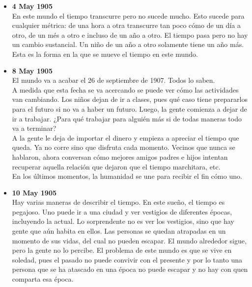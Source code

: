 \documentclass[12pt,a4paper]{report}
\begin{document}
\begin{itemize}
{\begin{itemize}[label=$\bullet$]
{            desata una de las peores olas de crímen en la historia. ¿Esto
            último es el resultado de lo primero o una causa colocada de una
            manera distinta a la que estamos acostumbrados?\\
            Los científicos no tienen prestigio, pues sus predicciónes se han
            vuelto descripciones. \\
            En este mundo, la gente vive sin temer por las consecuencias que sus
            acciones puedan traer en el futuro, pues esas consecuencias ya
            sucedieron.
        }
        \item{\textbf{4 May 1905}\\
            En este mundo el tiempo transcurre pero no sucede mucho. Esto sucede
            para cualquier métrica: de una hora a otra transcurre tan poco cómo
            de un día a otro, de un més a otro e incluso de un año a otro. El
            tiempo pasa pero no hay un cambio sustancial. Un niño de un año a
            otro solamente tiene un año más. Esta es la forma en la que se mueve
            el tiempo en este mundo.
        }
        \item{\textbf{8 May 1905}\\
            El mundo va a acabar el 26 de septiembre de 1907. Todos lo saben.\\
            A medida que esta fecha se va acercando se puede ver cómo las
            actividades van cambiando. Los niños dejan de ir a clases, pues qué
            caso tiene prepararlos para el futuro si no va a haber un futuro.
            Luego, la gente comienza a dejar de ir a trabajar. ¿Para qué
            trabajar para alguién más si de todas maneras todo va a terminar?\\
            A la gente le deja de importar el dinero y empieza a apreciar el
            tiempo que queda. Ya no corre sino que disfruta cada momento.
            Vecinos que nunca se hablaron, ahora conversan cómo mejores amigos
            padres e hijos intentan recuperar aquella relación que dejaron que
            el tiempo marchitara, etc.\\
            En los últimos momentos, la humanidad se une para recibir el fin
            cómo uno.
        }
        \item{\textbf{10 May 1905}\\
            Hay varias maneras de describir el tiempo. En este sueño, el tiempo
            es pegajoso. Uno puede ir a una ciudad y ver vestigios de diferentes
            épocas, incluyendo la actual. Lo sorprendente no es ver los
            vestigios, sino que hay gente que aún habita en ellos. Las personas
            se quedan atrapadas en un momento de sus vidas, del cual no pueden
            escapar. El mundo alrededor sigue, pero la gente no lo percibe. El
            problema de este mundo es que se vive en soledad, pues el pasado no
            puede convivir con el presente y por lo tanto una persona que se ha
            atascado en una época no puede escapar y no hay con quen comparta
            esa época.
        }
    \end{itemize}
}
\end{itemize}
\end{document}
